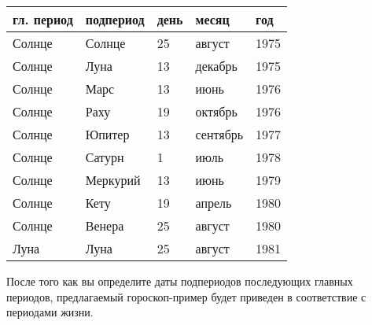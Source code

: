 \begin{table}[tph!]
	\centering

	\renewcommand{\arraystretch}{1.5}

	\begin{tabular}{|lllll|}
		\hline
		гл. период & подпериод & день & месяц & год \\
		\hline
		Солнце & Солнце & 25 & август & 1975 \\
		Солнце & Луна & 13 & декабрь & 1975 \\
		Солнце & Марс & 13 & июнь & 1976 \\
		Солнце & Раху & 19 & октябрь & 1976 \\
		Солнце & Юпитер & 13 & сентябрь & 1977 \\
		Солнце & Сатурн & 1 & июль & 1978 \\
		Солнце & Меркурий & 13 & июнь & 1979 \\
		Солнце & Кету & 19 & апрель & 1980 \\
		Солнце & Венера & 25 & август & 1980 \\
		Луна & Луна & 25& август & 1981 \\
		\hline
	\end{tabular}
\end{table}

После того как вы определите даты подпериодов последующих главных периодов, предлагаемый гороскоп-пример будет приведен в соответствие с периодами жизни.
